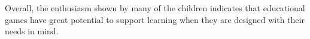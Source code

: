 Overall, the enthusiasm shown by many of the children indicates that educational games have great potential to support learning when they are designed with their needs in mind.





